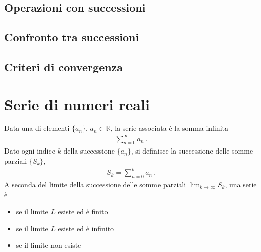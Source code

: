 \documentclass[letterpaper,10pt,italian]{jupyterBook}
\begin{document}
\subsection{Operazioni con successioni}
\label{\detokenize{ch/series:operazioni-con-successioni}}
\sphinxAtStartPar
{}


\subsection{Confronto tra successioni}
\label{\detokenize{ch/series:confronto-tra-successioni}}
\sphinxAtStartPar
{}


\subsection{Criteri di convergenza}
\label{\detokenize{ch/series:criteri-di-convergenza}}
\sphinxAtStartPar
{}


\section{Serie di numeri reali}
\label{\detokenize{ch/series:serie-di-numeri-reali}}\label{\detokenize{ch/series:math-hs-series-real-series}}
\sphinxAtStartPar
{} Data una  di elementi \(\{ a_n \}\), \(a_n \in \mathbb{R}\), la serie associata è la somma infinita
\begin{equation*}
\begin{split}\sum_{n=0}^{\infty} a_n \ .\end{split}
\end{equation*}
\sphinxAtStartPar
Dato ogni indice \(k\) della successione \(\{ a_n \}\), si definisce la successione delle somme parziali \(\{ S_k \}\),
\begin{equation*}
\begin{split}S_k = \sum_{n=0}^{k} a_n \ .\end{split}
\end{equation*}
\sphinxAtStartPar
{}
A seconda del limite della successione delle somme parziali \(\lim_{k \rightarrow \infty} S_k\), una serie è
\begin{itemize}
\item {} 
\sphinxAtStartPar
{} se il limite \(L\) esiste ed è finito

\item {} 
\sphinxAtStartPar
{} se il limite \(L\) esiste ed è infinito

\item {} 
\sphinxAtStartPar
{} se il limite non esiste

\end{itemize}
\end{document}
